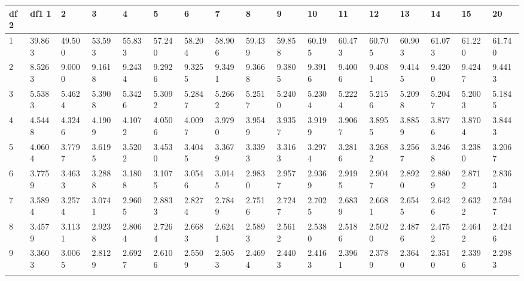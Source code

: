  {
 \fontsize{6pt}{6pt}
 \selectfont

\begin{tabular}{|m{8pt}|m{18pt}*{15}{m{18pt}}}\hline 
df2  & df1      1  &      2  &      3  &      4  &      5  &      6  &      7  &      8  &      9  &     10  &     11  &     12  &     13  &     14  &     15  &     20   \\ \hline 
  1 & 39.863 & 49.500 & 53.593 & 55.833 & 57.240 & 58.204 & 58.906 & 59.439 & 59.858 & 60.195 & 60.473 & 60.705 & 60.903 & 61.073 & 61.220 & 61.740 \\[2pt] \arrayrulecolor{light-gray}\hline\arrayrulecolor{black}  
  2 & 8.5263 & 9.0000 & 9.1618 & 9.2434 & 9.2926 & 9.3255 & 9.3491 & 9.3668 & 9.3805 & 9.3916 & 9.4006 & 9.4081 & 9.4145 & 9.4200 & 9.4247 & 9.4413 \\[2pt] \arrayrulecolor{light-gray}\hline\arrayrulecolor{black}  
  3 & 5.5383 & 5.4624 & 5.3908 & 5.3426 & 5.3092 & 5.2847 & 5.2662 & 5.2517 & 5.2400 & 5.2304 & 5.2224 & 5.2156 & 5.2098 & 5.2047 & 5.2003 & 5.1845 \\[2pt] \arrayrulecolor{light-gray}\hline\arrayrulecolor{black}  
  4 & 4.5448 & 4.3246 & 4.1909 & 4.1072 & 4.0506 & 4.0097 & 3.9790 & 3.9549 & 3.9357 & 3.9199 & 3.9067 & 3.8955 & 3.8859 & 3.8776 & 3.8704 & 3.8443 \\[2pt] \arrayrulecolor{light-gray}\hline\arrayrulecolor{black}  
  5 & 4.0604 & 3.7797 & 3.6195 & 3.5202 & 3.4530 & 3.4045 & 3.3679 & 3.3393 & 3.3163 & 3.2974 & 3.2816 & 3.2682 & 3.2567 & 3.2468 & 3.2380 & 3.2067 \\[2pt] \arrayrulecolor{light-gray}\hline\arrayrulecolor{black}  
  6 & 3.7759 & 3.4633 & 3.2888 & 3.1808 & 3.1075 & 3.0546 & 3.0145 & 2.9830 & 2.9577 & 2.9369 & 2.9195 & 2.9047 & 2.8920 & 2.8809 & 2.8712 & 2.8363 \\[2pt] \arrayrulecolor{light-gray}\hline\arrayrulecolor{black}  
  7 & 3.5894 & 3.2574 & 3.0741 & 2.9605 & 2.8833 & 2.8274 & 2.7849 & 2.7516 & 2.7247 & 2.7025 & 2.6839 & 2.6681 & 2.6545 & 2.6426 & 2.6322 & 2.5947 \\[2pt] \arrayrulecolor{light-gray}\hline\arrayrulecolor{black}  
  8 & 3.4579 & 3.1131 & 2.9238 & 2.8064 & 2.7264 & 2.6683 & 2.6241 & 2.5893 & 2.5612 & 2.5380 & 2.5186 & 2.5020 & 2.4876 & 2.4752 & 2.4642 & 2.4246 \\[2pt] \arrayrulecolor{light-gray}\hline\arrayrulecolor{black}  
  9 & 3.3603 & 3.0065 & 2.8129 & 2.6927 & 2.6106 & 2.5509 & 2.5053 & 2.4694 & 2.4403 & 2.4163 & 2.3961 & 2.3789 & 2.3640 & 2.3510 & 2.3396 & 2.2983 \\[2pt] \arrayrulecolor{light-gray}\hline\arrayrulecolor{black}  

\end{tabular}}

